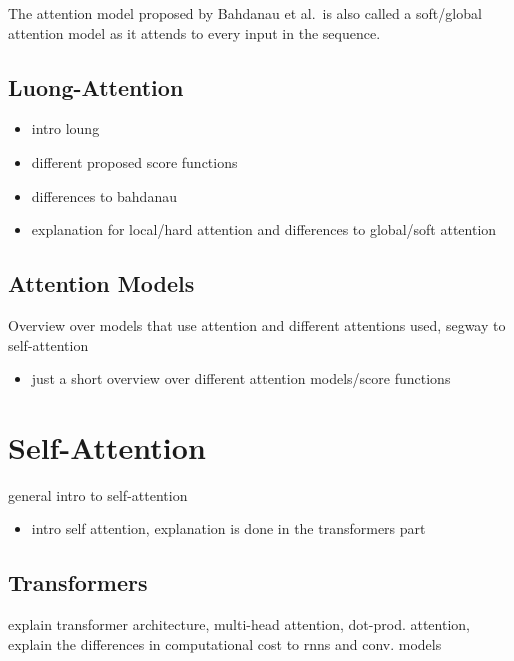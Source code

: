 \documentclass[]{krantz}
\providecommand{\tightlist}{%
  \setlength{\itemsep}{0pt}\setlength{\parskip}{0pt}}
\begin{document}
The attention model proposed by Bahdanau et al.~is also called a soft/global attention model as it attends
to every input in the sequence.

\hypertarget{luong-attention}{%
\subsection{Luong-Attention}\label{luong-attention}}

\begin{itemize}
\item
  intro loung
\item
  different proposed score functions
\item
  differences to bahdanau
\item
  explanation for local/hard attention and differences to global/soft attention
\end{itemize}

\hypertarget{attention-models}{%
\subsection{Attention Models}\label{attention-models}}

Overview over models that use attention and different attentions used, segway to self-attention

\begin{itemize}
\tightlist
\item
  just a short overview over different attention models/score functions
\end{itemize}

\hypertarget{self-attention-1}{%
\section{Self-Attention}\label{self-attention-1}}

general intro to self-attention

\begin{itemize}
\tightlist
\item
  intro self attention, explanation is done in the transformers part
\end{itemize}

\hypertarget{transformers}{%
\subsection{Transformers}\label{transformers}}

explain transformer architecture, multi-head attention, dot-prod. attention, explain the differences in computational cost to rnns and conv. models
\end{document}
